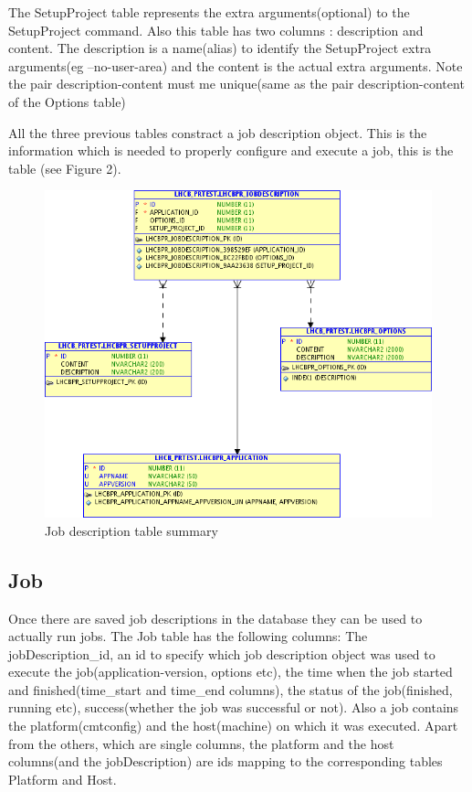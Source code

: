 \documentclass{lhcbnote}
\begin{document}
\vspace{4 mm}

The SetupProject table represents the extra arguments(optional) to the SetupProject command. Also this table has two
columns : description and content. The description is a name(alias) to identify the SetupProject extra arguments(eg --no-user-area)
and the content is the actual extra arguments. Note the pair description-content must me unique(same as the pair description-content of the
Options table)

\vspace{6 mm}

All the three previous tables constract a job description object. This is the information which is needed 
to properly configure and execute a job, this is the table (see Figure 2).

\begin{figure}[ht!]
\centering
\includegraphics[width=170mm]{jobdescription.png}
\caption{Job description table summary}
\label{overflow}
\end{figure}


\subsection{Job}

Once there are saved job descriptions in the database they can be used to actually run jobs.
The Job table has the following columns: The jobDescription\_id, an id to specify which job description object 
was used to execute the job(application-version, options etc), the time when the job started and finished(time\_start and time\_end columns), 
the status of the job(finished, running etc), success(whether the job was successful or not). Also a job contains the platform(cmtconfig) 
and the host(machine) on which it was executed. Apart from the others, which are single columns, the platform and the host columns(and the 
jobDescription) are ids mapping to the corresponding tables Platform and Host. 
\end{document}

